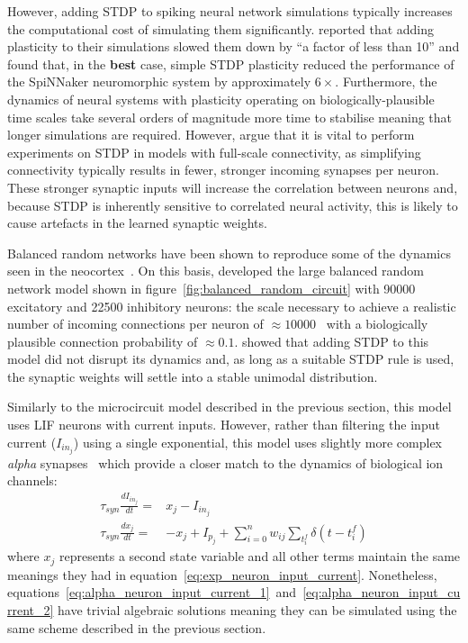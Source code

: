 \documentclass[utf8]{frontiersSCNS} %
\begin{document}
However, adding STDP to spiking neural network simulations typically increases the computational cost of simulating them significantly. 
\citet{Morrison2007} reported that adding plasticity to their simulations slowed them down by ``a factor of less than 10'' and \citet{Knight2016b} found that, in the \textbf{best} case, simple STDP plasticity reduced the performance of the SpiNNaker neuromorphic system by approximately $6\times$.
Furthermore, the dynamics of neural systems with plasticity operating on biologically-plausible time scales take several orders of magnitude more time to stabilise meaning that longer simulations are required.
However, \citeauthor{Morrison2007} argue that it is vital to perform experiments on STDP in models with full-scale connectivity, as simplifying connectivity typically results in fewer, stronger incoming synapses per neuron.
These stronger synaptic inputs will increase the correlation between neurons and, because STDP is inherently sensitive to correlated neural activity, this is likely to cause artefacts in the learned synaptic weights.

Balanced random networks have been shown to reproduce some of the dynamics seen in the neocortex~\citep{Brunel1999,Brunel2000}.
On this basis, \citet{Morrison2007} developed the large balanced random network model shown in figure~\ref{fig:balanced_random_circuit} with \num{90000} excitatory and \num{22500} inhibitory neurons: the scale necessary to achieve a realistic number of incoming connections per neuron of $\approx 10000$~\citep{braitenberg2013cortex} with a biologically plausible connection probability of $\approx 0.1$.
\citeauthor{Morrison2007} showed that adding STDP to this model did not disrupt its dynamics and, as long as a suitable STDP rule is used, the synaptic weights will settle into a stable unimodal distribution.

Similarly to the microcircuit model described in the previous section, this model uses LIF neurons with current inputs.
However, rather than filtering the input current ($I_{{in}_{j}}$) using a single exponential, this model uses slightly more complex \textit{alpha} synapses~\citep{Rall1967} which provide a closer match to the dynamics of biological ion channels:
%
\begin{align}
    \tau_{syn} \frac{dI_{{in}_{j}}}{dt} = & x_{j} - I_{{in}_{j}} \label{eq:alpha_neuron_input_current_1}\\ 
    \tau_{syn} \frac{dx_{j}}{dt} = & -x_{j} + I_{p_{j}} + \sum_{i=0}^{n} w_{ij} \sum_{t_{i}^{f}}  \delta(t - t_{i}^{f}) \label{eq:alpha_neuron_input_current_2}
\end{align}
%
where $x_{j}$ represents a second state variable and all other terms maintain the same meanings they had in equation~\ref{eq:exp_neuron_input_current}.
Nonetheless, equations~\ref{eq:alpha_neuron_input_current_1}~and~\ref{eq:alpha_neuron_input_current_2} have trivial algebraic solutions meaning they can be simulated using the same scheme described in the previous section.
\end{document}
